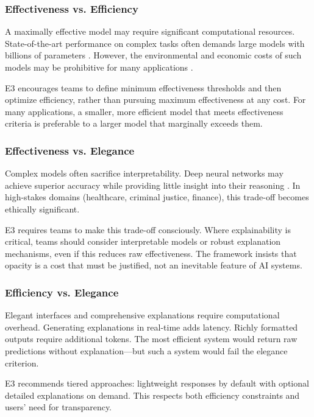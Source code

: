 \documentclass[11pt,a4paper]{article}
\begin{document}
\subsubsection{Effectiveness vs. Efficiency}

A maximally effective model may require significant computational resources. State-of-the-art performance on complex tasks often demands large models with billions of parameters \cite{brown2020language}. However, the environmental and economic costs of such models may be prohibitive for many applications \cite{strubell2019energy}.

E3 encourages teams to define minimum effectiveness thresholds and then optimize efficiency, rather than pursuing maximum effectiveness at any cost. For many applications, a smaller, more efficient model that meets effectiveness criteria is preferable to a larger model that marginally exceeds them.

\subsubsection{Effectiveness vs. Elegance}

Complex models often sacrifice interpretability. Deep neural networks may achieve superior accuracy while providing little insight into their reasoning \cite{ribeiro2016should}. In high-stakes domains (healthcare, criminal justice, finance), this trade-off becomes ethically significant.

E3 requires teams to make this trade-off consciously. Where explainability is critical, teams should consider interpretable models or robust explanation mechanisms, even if this reduces raw effectiveness. The framework insists that opacity is a cost that must be justified, not an inevitable feature of AI systems.

\subsubsection{Efficiency vs. Elegance}

Elegant interfaces and comprehensive explanations require computational overhead. Generating explanations in real-time adds latency. Richly formatted outputs require additional tokens. The most efficient system would return raw predictions without explanation---but such a system would fail the elegance criterion.

E3 recommends tiered approaches: lightweight responses by default with optional detailed explanations on demand. This respects both efficiency constraints and users' need for transparency.
\end{document}
